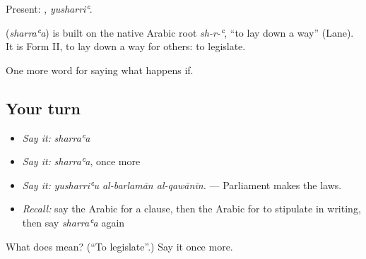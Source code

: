 Present: , \emph{yusharriʿ}.

\begin{cousinweb}
\textbf{} (\emph{sharraʿa}) is built on the native Arabic root \emph{sh-r-ʿ}, \textquotedblleft{}to lay down a way\textquotedblright{} (Lane). It is Form II, to lay down a way for others: to legislate.
\end{cousinweb}

\begin{grammarlens}[title={What you've built}]
One more word for saying what happens if.
\end{grammarlens}

\subsection*{Your turn}
\begin{itemize}
\raggedright
  \item \emph{Say it:} \emph{sharraʿa}
  \item \emph{Say it:} \emph{sharraʿa}, once more
  \item \emph{Say it:} \emph{yusharriʿu al-barlamān al-qawānīn.} — Parliament makes the laws.
  \item \emph{Recall:} say the Arabic for a clause, then the Arabic for to stipulate in writing, then say \emph{sharraʿa} again
\end{itemize}

\begin{tcolorbox}[breakable,colback=teal!4,colframe=teal!35!black,title={Before you move on}]
What does  mean? (\textquotedblleft{}To legislate\textquotedblright{}.) Say it once more.
\end{tcolorbox}
